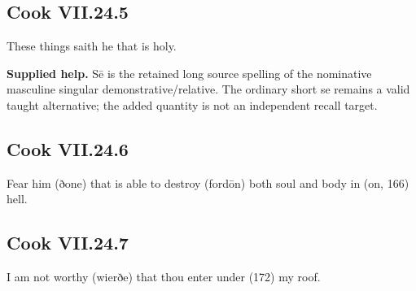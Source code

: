 \par\begin{minipage}{\linewidth}\raggedright
\subsection*{Cook VII.24.5}

These things saith he that is holy.

\textbf{Supplied help.} Sē is the retained long source spelling of the nominative masculine singular demonstrative/\allowbreak{}relative. The ordinary short se remains a valid taught alternative; the added quantity is not an independent recall target.

\end{minipage}\par\addvspace{4pt}

\par\begin{minipage}{\linewidth}\raggedright
\subsection*{Cook VII.24.6}

Fear him (ðone) that is able to destroy (fordōn) both soul and body in (on, 166) hell.

\end{minipage}\par\addvspace{4pt}

\par\begin{minipage}{\linewidth}\raggedright
\subsection*{Cook VII.24.7}

I am not worthy (wierðe) that thou enter under (172) my roof.

\end{minipage}\par\addvspace{4pt}

